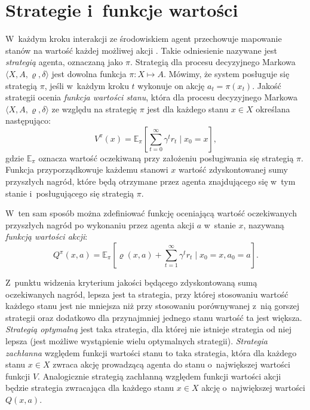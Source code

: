 \documentclass[a4paper, 12pt, oneside]{report}
\begin{document}
\section{Strategie i~funkcje wartości}
 W~każdym kroku interakcji ze środowiskiem agent przechowuje mapowanie stanów na wartość każdej możliwej akcji \cite{SuttonBarto98,Cichosz00}. Takie odniesienie nazywane jest \emph{strategią} agenta, oznaczaną jako $\pi$. Strategią dla procesu decyzyjnego Markowa $\langle X, A, \varrho, \delta \rangle$ jest dowolna funkcja $\pi : X \mapsto A$. Mówimy, że system posługuje się strategią $\pi$, jeśli w~każdym kroku $t$ wykonuje on akcję $a_t=\pi(x_t)$. Jakość strategii ocenia \emph{funkcja wartości stanu}, która dla procesu decyzyjnego Markowa $\langle X, A, \varrho, \delta \rangle$ ze względu na strategię $\pi$ jest dla każdego stanu $x \in X$ określana następująco:
\begin{equation}
    V^\pi(x) = \mathbb{E}_\pi\left[\sum_{t=0}^{\infty}\gamma^t r_t \mid x_0 = x\right],
\end{equation}
gdzie $\mathbb{E}_\pi$ oznacza wartość oczekiwaną przy założeniu posługiwania się strategią $\pi$. Funkcja przyporządkowuje każdemu stanowi $x$ wartość zdyskontowanej sumy przyszłych nagród, które będą otrzymane przez agenta znajdującego się w~tym stanie i~posługującego się strategią $\pi$.

 W~ten sam sposób można zdefiniować funkcję oceniającą wartość oczekiwanych przyszłych nagród po wykonaniu przez agenta akcji $a$ w~stanie $x$, nazywaną \emph{funkcją wartości akcji}:
\begin{equation}
    Q^\pi(x,a) = \mathbb{E}_\pi\left[\varrho(x,a)+\sum_{t=1}^{\infty}\gamma^t r_t \mid x_0 = x, a_0 = a\right].
\end{equation}

 Z~punktu widzenia kryterium jakości będącego zdyskontowaną sumą oczekiwanych nagród, lepsza jest ta strategia, przy której stosowaniu wartość każdego stanu jest nie mniejsza niż przy stosowaniu porównywanej z~nią gorszej strategii oraz dodatkowo dla przynajmniej jednego stanu wartość ta jest większa. \emph{Strategią optymalną} jest taka strategia, dla której nie istnieje strategia od niej lepsza (jest możliwe wystąpienie wielu optymalnych strategii). \emph{Strategia zachłanna} względem funkcji wartości stanu to taka strategia, która dla każdego stanu $x \in X$ zwraca akcję prowadzącą agenta do stanu o~największej wartości funkcji $V$. Analogicznie strategią zachłanną względem funkcji wartości akcji będzie strategia zwracająca dla każdego stanu $x \in X$ akcję o~największej wartości $Q(x,a)$.
\end{document}
